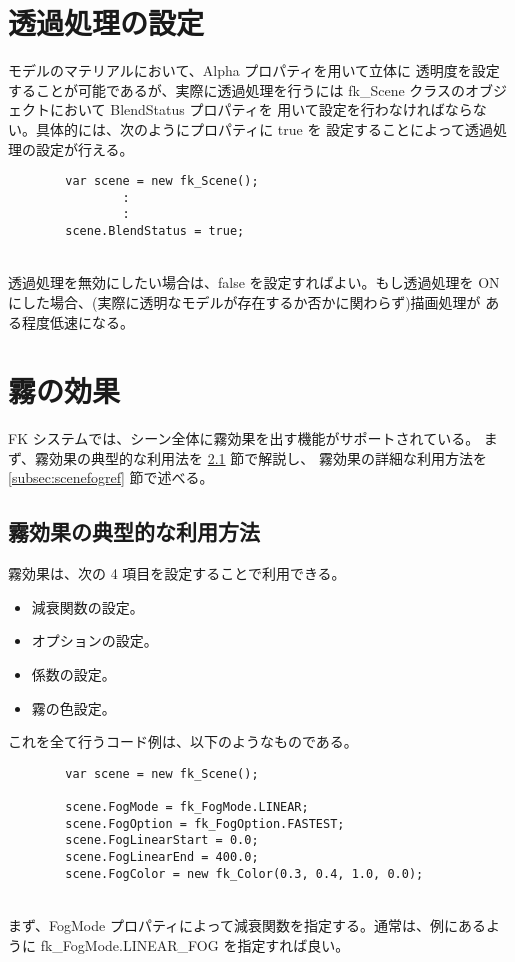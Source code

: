 \section{透過処理の設定} \label{sec:scenetrans}
モデルのマテリアルにおいて、Alpha プロパティを用いて立体に
透明度を設定することが可能であるが、実際に透過処理を行うには
fk\_Scene クラスのオブジェクトにおいて BlendStatus プロパティを
用いて設定を行わなければならない。具体的には、次のようにプロパティに true を
設定することによって透過処理の設定が行える。
\\
\begin{screen}
\begin{verbatim}
        var scene = new fk_Scene();
                :
                :
        scene.BlendStatus = true;
\end{verbatim}
\end{screen}
~ \\
透過処理を無効にしたい場合は、false を設定すればよい。もし透過処理を
ON にした場合、(実際に透明なモデルが存在するか否かに関わらず)描画処理が
ある程度低速になる。

\section{霧の効果}
FK システムでは、シーン全体に霧効果を出す機能がサポートされている。
まず、霧効果の典型的な利用法を \ref{subsec:scenefogintro} 節で解説し、
霧効果の詳細な利用方法を \ref{subsec:scenefogref} 節で述べる。

\subsection{霧効果の典型的な利用方法} \label{subsec:scenefogintro}
霧効果は、次の 4 項目を設定することで利用できる。
\begin{itemize}
 \item 減衰関数の設定。
 \item オプションの設定。
 \item 係数の設定。
 \item 霧の色設定。
\end{itemize}
これを全て行うコード例は、以下のようなものである。
\\
\begin{breakbox}
\begin{verbatim}
        var scene = new fk_Scene();

        scene.FogMode = fk_FogMode.LINEAR;
        scene.FogOption = fk_FogOption.FASTEST;
        scene.FogLinearStart = 0.0;
        scene.FogLinearEnd = 400.0;
        scene.FogColor = new fk_Color(0.3, 0.4, 1.0, 0.0);
\end{verbatim}
\end{breakbox}
~ \\
まず、FogMode プロパティによって減衰関数を指定する。通常は、例にあるように
fk\_FogMode.LINEAR\_FOG を指定すれば良い。

